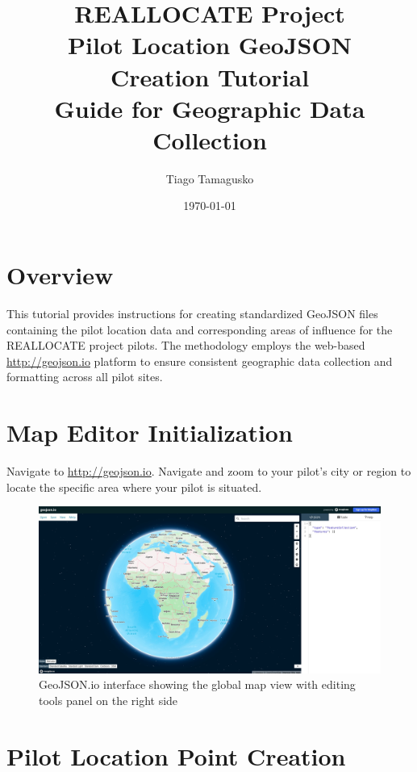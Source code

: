 \documentclass[11pt,a4paper]{article}
\title{
    \vspace{-2cm}
    {\Large\bfseries\color{maincolor} REALLOCATE Project}\\
    \vspace{0.5cm}
    {\Huge\bfseries Pilot Location GeoJSON\\Creation Tutorial}\\
    \vspace{0.3cm}
    {\large Guide for Geographic Data Collection}
}
\author{Tiago Tamagusko}
\date{\today}
\begin{document}
\maketitle
\thispagestyle{empty}

\vspace{1cm}

\section*{Overview}

This tutorial provides instructions for creating standardized GeoJSON files containing the pilot location data and corresponding areas of influence for the REALLOCATE project pilots. The methodology employs the web-based \url{http://geojson.io} platform to ensure consistent geographic data collection and formatting across all pilot sites.

\vspace{0.5cm}

\section{Map Editor Initialization}

Navigate to \url{http://geojson.io}. Navigate and zoom to your pilot's city or region to locate the specific area where your pilot is situated.

\begin{figure}[H]
    \centering
    \includegraphics[width=\textwidth]{img/step1.jpg}
    \caption{GeoJSON.io interface showing the global map view with editing tools panel on the right side}
    \label{fig:step1}
\end{figure}

\newpage

\section{Pilot Location Point Creation}
\end{document}
